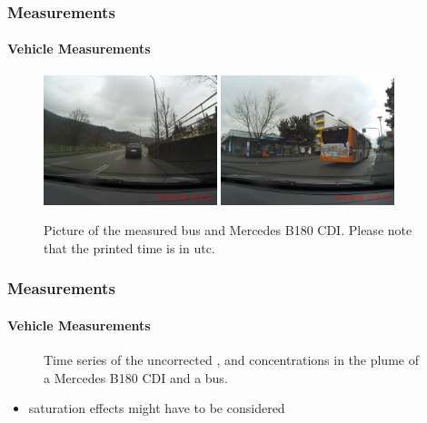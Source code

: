 \documentclass[english]{beamer}
\begin{document}
\begin{frame}
  \frametitle{Measurements}
  \framesubtitle{Vehicle Measurements}
  \begin{figure}[htbp]
    \centering
    \includegraphics[width=0.45\textwidth]{mercedes.jpg}
    \hfill  
    \includegraphics[width=0.45\textwidth]{bus.jpg}
    \caption{Picture of the measured bus and Mercedes B180 CDI. Please note that
      the printed time is in utc.}
    \label{fig:bus}
  \end{figure}
\end{frame}

\begin{frame}
  \frametitle{Measurements}
  \framesubtitle{Vehicle Measurements}
  \begin{figure}[htbp]
    \centering
    \scalebox{.42}{
      
    }
    \hfill
    \scalebox{.42}{
      
    }
    \caption{Time series of the uncorrected ,  and
       concentrations in the plume of a Mercedes B180 CDI and
      a bus.}
    \label{fig:mercedes-ts}
  \end{figure}
  \begin{itemize}
  \item {} saturation effects might have to be considered
  \end{itemize}
\end{frame}

\end{document}
